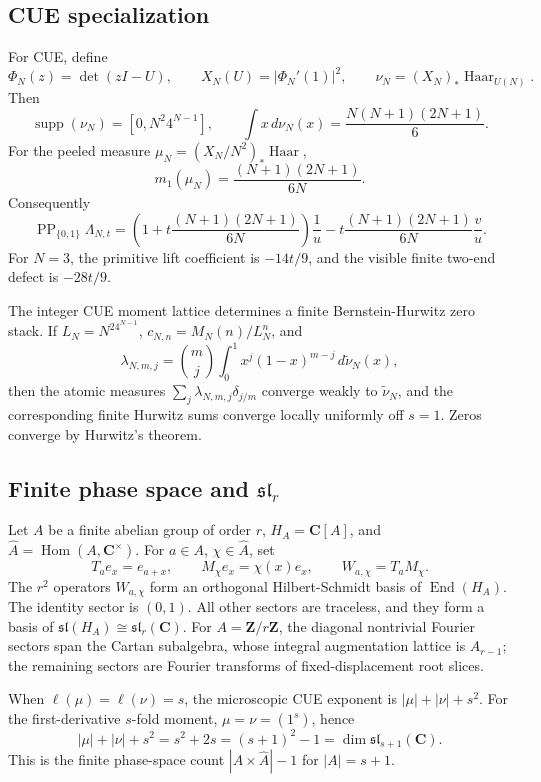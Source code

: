 \documentclass[11pt]{article}
\newcommand{\C}{\mathbf C}
\newcommand{\Z}{\mathbf Z}
\newcommand{\PP}{\operatorname{PP}}
\newcommand{\End}{\operatorname{End}}
\newcommand{\supp}{\operatorname{supp}}
\newcommand{\Hom}{\operatorname{Hom}}
\newcommand{\Haar}{\operatorname{Haar}}
\newcommand{\wt}{\widetilde}
\theoremstyle{plain}
\theoremstyle{definition}
\numberwithin{equation}{section}
\begin{document}
\subsection{CUE specialization}

For CUE, define
\[
 \Phi_N(z)=\det(zI-U),
 \qquad
 X_N(U)=|\Phi_N'(1)|^2,
 \qquad
 \nu_N=(X_N)_*\Haar_{U(N)}.
\]
Then
\[
 \supp(\nu_N)=[0,N^2 4^{N-1}],
 \qquad
 \int x\,d\nu_N(x)=\frac{N(N+1)(2N+1)}6.
\]
For the peeled measure \(\mu_N=(X_N/N^2)_*\Haar\),
\[
 m_1(\mu_N)=\frac{(N+1)(2N+1)}{6N}.
\]
Consequently
\[
 \PP_{\{0,1\}}\Lambda_{N,t}=\left(1+t\frac{(N+1)(2N+1)}{6N}\right)\frac1u
 -t\frac{(N+1)(2N+1)}{6N}\frac vu.
\]
For \(N=3\), the primitive lift coefficient is \(-14t/9\), and the visible finite two-end defect is \(-28t/9\).

The integer CUE moment lattice determines a finite Bernstein-Hurwitz zero stack.  If \(L_N=N^24^{N-1}\), \(c_{N,n}=M_N(n)/L_N^n\), and
\[
 \lambda_{N,m,j}=\binom mj\int_0^1 x^j(1-x)^{m-j}\,d\wt\nu_N(x),
\]
then the atomic measures \(\sum_j\lambda_{N,m,j}\delta_{j/m}\) converge weakly to \(\wt\nu_N\), and the corresponding finite Hurwitz sums converge locally uniformly off \(s=1\).  Zeros converge by Hurwitz's theorem.

\subsection{Finite phase space and \(\mathfrak{sl}_r\)}

Let \(A\) be a finite abelian group of order \(r\), \(H_A=\C[A]\), and \(\widehat A=\Hom(A,\C^\times)\).  For \(a\in A\), \(\chi\in\widehat A\), set
\[
 T_ae_x=e_{a+x},
 \qquad
 M_\chi e_x=\chi(x)e_x,
 \qquad
 W_{a,\chi}=T_aM_\chi.
\]
The \(r^2\) operators \(W_{a,\chi}\) form an orthogonal Hilbert-Schmidt basis of \(\End(H_A)\).  The identity sector is \((0,1)\).  All other sectors are traceless, and they form a basis of \(\mathfrak{sl}(H_A)\cong\mathfrak{sl}_r(\C)\).  For \(A=\Z/r\Z\), the diagonal nontrivial Fourier sectors span the Cartan subalgebra, whose integral augmentation lattice is \(A_{r-1}\); the remaining sectors are Fourier transforms of fixed-displacement root slices.

When \(\ell(\mu)=\ell(\nu)=s\), the microscopic CUE exponent is \(|\mu|+|\nu|+s^2\).  For the first-derivative \(s\)-fold moment, \(\mu=\nu=(1^s)\), hence
\[
 |\mu|+|\nu|+s^2=s^2+2s=(s+1)^2-1=\dim\mathfrak{sl}_{s+1}(\C).
\]
This is the finite phase-space count \(|A\times\widehat A|-1\) for \(|A|=s+1\).
\end{document}
